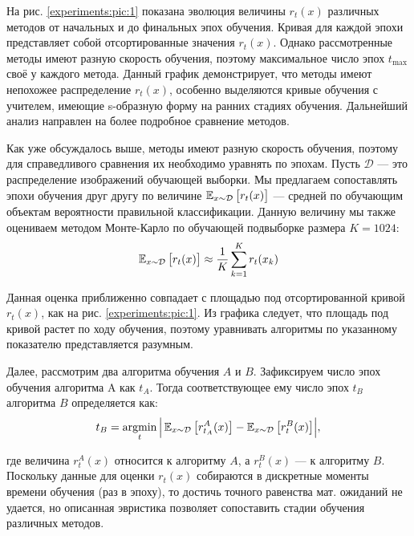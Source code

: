 На рис. \ref{experiments:pic:1} показана эволюция величины $r_t(x)$ различных методов от начальных и до финальных эпох обучения. Кривая для каждой эпохи представляет собой отсортированные значения $r_t(x)$. Однако рассмотренные методы имеют разную скорость обучения, поэтому максимальное число эпох $t_{\max}$ своё у каждого метода. Данный график демонстрирует, что методы имеют непохожее распределение $r_t(x)$, особенно выделяются кривые обучения с учителем, имеющие s-образную форму на ранних стадиях обучения. Дальнейший анализ направлен на более подробное сравнение методов.

Как уже обсуждалось выше, методы имеют разную скорость обучения, поэтому для справедливого сравнения их необходимо уравнять по эпохам. Пусть $\mathcal{D}$ --- это распределение изображений обучающей выборки. Мы предлагаем сопоставлять эпохи обучения друг другу по величине $\operatorname{\mathbb{E}}_{x \sim \mathcal{D}} \big[r_t(x)\big]$ --- средней по обучающим объектам вероятности правильной классификации. Данную величину мы также оцениваем методом Монте-Карло по обучающей подвыборке размера $K=1024$:
\begin{equation}
    \operatorname{\mathbb{E}}_{x \sim \mathcal{D}} \big[r_t(x)\big] \approx \frac{1}{K} \sum_{k=1}^K r_t(x_k)
\end{equation}

\noindent
Данная оценка приближенно совпадает с площадью под отсортированной кривой $r_t(x)$, как на рис. \ref{experiments:pic:1}. Из графика следует, что площадь под кривой растет по ходу обучения, поэтому уравнивать алгоритмы по указанному показателю представляется разумным.

Далее, рассмотрим два алгоритма обучения $A$ и $B$. Зафиксируем число эпох обучения алгоритма A как $t_A$. Тогда соответствующее ему число эпох $t_B$ алгоритма $B$ определяется как:
\begin{equation}
    t_B = \operatorname*{argmin}_t \Big|\operatorname{\mathbb{E}}_{x \sim \mathcal{D}} \big[r^A_{t_A}(x)\big] - \operatorname{\mathbb{E}}_{x \sim \mathcal{D}} \big[r^B_{t}(x)\big]\Big|,
\end{equation}

\noindent
где величина $r^A_{t}(x)$ относится к алгоритму $A$, а $r^B_{t}(x)$ --- к алгоритму $B$. Поскольку данные для оценки $r_t(x)$ собираются в дискретные моменты времени обучения (раз в эпоху), то достичь точного равенства мат. ожиданий не удается, но описанная эвристика позволяет сопоставить стадии обучения различных методов.

